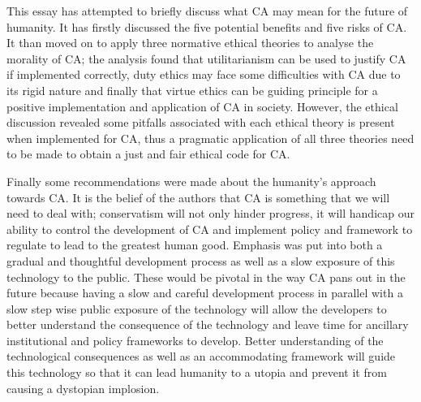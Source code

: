 This essay has attempted to briefly discuss what CA may mean for the future of humanity. It has firstly discussed the five potential benefits and five risks of CA. It than moved on to apply three normative ethical theories to analyse the morality of CA; the analysis found that utilitarianism can be used to justify CA if implemented correctly, duty ethics may face some difficulties with CA due to its rigid nature and finally that virtue ethics can be guiding principle for a positive implementation and application of CA in society. However, the ethical discussion revealed some pitfalls associated with each ethical theory is present when implemented for CA, thus a pragmatic application of all three theories need to be made to obtain a just and fair ethical code for CA.

Finally some recommendations were made about the humanity's approach towards CA. It is the belief of the authors that CA is something that we will need to deal with; conservatism will not only hinder progress, it will handicap our ability to control the development of CA and implement policy and framework to regulate to lead to the greatest human good. Emphasis was put into both a gradual and thoughtful development process as well as a slow exposure of this technology to the public. These would be pivotal in the way CA pans out in the future because having a slow and careful development process in parallel with a slow step wise public exposure of the technology will allow the developers to better understand the consequence of the technology and leave time for ancillary institutional and policy frameworks to develop. Better understanding of the technological consequences as well as an accommodating framework will guide this technology so that it can lead humanity to a utopia and prevent it from causing a dystopian implosion.
